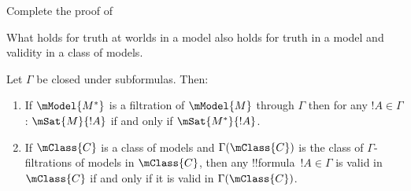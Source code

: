 \documentclass[../../../include/open-logic-section]{subfiles}
\begin{document}
\begin{prob}
  Complete the proof of 
\end{prob}

What holds for truth at worlds in a model also holds for truth in a
model and validity in a class of models.

\begin{cor}
  Let $\Gamma$ be closed under subformulas. Then:
  \begin{enumerate}
  \item If $\mModel{M^*}$ is a filtration of $\mModel{M}$ through
    $\Gamma$ then for any $!A \in \Gamma$: $\mSat{M}{!A}$ if and only
    if $\mSat{M^*}{!A}$.
  \item If $\mClass{C}$ is a class of models and $\Gamma(\mClass{C})$
    is the class of $\Gamma$-filtrations of models in $\mClass{C}$,
    then any !!{formula}~$!A \in \Gamma$ is valid in $\mClass{C}$ if
    and only if it is valid in $\Gamma(\mClass{C})$.
  \end{enumerate}
\end{cor}
\end{document}
